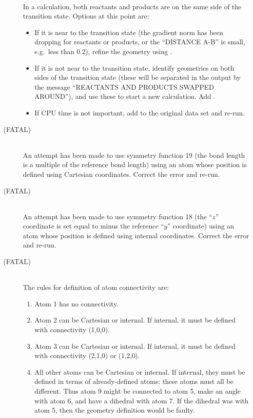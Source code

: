 \begin{description}
\item[]~\\
In a  calculation, both reactants and products are on the same side
of the transition state.  Options at this point are:
\begin{itemize}
\item If it is near to the transition state (the gradient norm has been dropping
for reactants or products, or the ``DISTANCE A-B'' is small, e.g.\ less than 
0.2), refine the geometry using .
\item If it is not near to the transition state, identify geometries on
both sides of the transition state (these will be separated in the output by
the message ``REACTANTS AND PRODUCTS SWAPPED AROUND''), and use these to start
a new  calculation.  Add .
\item If CPU time is not important, add  to the original data set
and re-run.
\end{itemize}

\item[ (FATAL)]~\\
An attempt has been made to use symmetry function 19 (the bond length is
a multiple of the reference bond length) using an atom whose position is 
defined using Cartesian coordinates.  Correct the error and re-run.

\item[ (FATAL)]~\\
An attempt has been made to use symmetry function 18 (the ``$z$'' coordinate is
set equal to minus the reference ``$y$'' coordinate) using an atom whose
position is defined using internal coordinates.  Correct the error and re-run.

\item[ (FATAL)]~\\
The rules for definition of atom connectivity are:
\begin{enumerate}
\item Atom 1 has no connectivity.
\item Atom 2 can be Cartesian or internal.  If internal, it must be defined
with connectivity (1,0,0).
\item Atom 3 can be Cartesian or internal.  If internal, it must be defined 
with connectivity (2,1,0) or (1,2,0). 
\item All other atoms can be Cartesian or internal.  If internal, they
must be defined  in  terms  of  already-defined
atoms:   these  atoms must all be different.  Thus atom 9 might
be connected to atom 5, make an angle with atom 6, and  have  a
dihedral  with  atom  7.  If the dihedral was with atom 5, then
the geometry definition would be faulty.
\end{enumerate}
 

\end{description}
